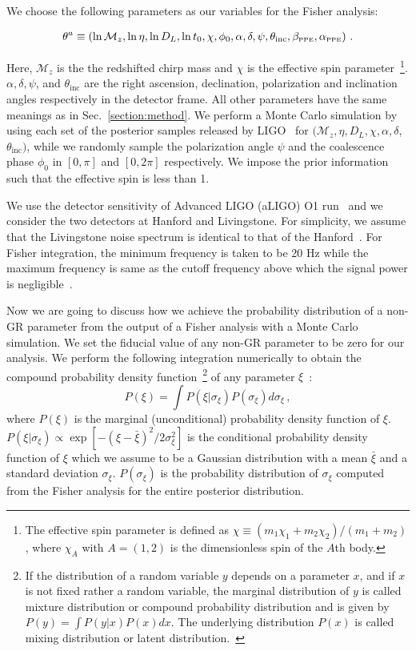 \documentclass[prd,twocolumn,nofootinbib]{revtex4-1}
\newcommand\be{\begin{equation}}
\newcommand\ba{\begin{eqnarray}}
\newcommand\ee{\end{equation}}
\newcommand\ea{\end{eqnarray}}
\newcommand\bw{\begin{widetext}}
\newcommand\ew{\end{widetext}}
\newcommand{\lb}{\left(}
\newcommand{\rb}{\right)}
\newcommand{\PPE}{{\mbox{\tiny PPE}}}
\begin{document}
We choose the following parameters as our variables for the Fisher analysis:
\bw
\ba\label{parameters}
\theta^a\equiv \lb \ln{\mathcal{M}_z}, \ln{\eta}, \ln{D_L}, \ln{t_0}, \chi, \phi_0, \alpha, \delta, \psi, \theta_{\text{inc}}, \beta_{\PPE}, \alpha_{\PPE} \rb\,.
\ea
\ew
Here, $\mathcal{M}_z$ is the the redshifted chirp mass and $\chi$ is the effective spin parameter~\footnote{The effective spin parameter is defined as $\chi\equiv\lb m_1 \chi_1+m_2\chi_2\rb /\lb m_1+m_2\rb$, where $\chi_A$ with $A=(1,2)$ is the dimensionless spin of the $A$th body.}. $\alpha, \delta, \psi$, and  $\theta_{\text{inc}}$ are the right ascension, declination, polarization and inclination angles respectively in the detector frame. All other parameters have the same meanings as in Sec.~\ref{section:method}. 
We perform a Monte Carlo simulation by using each set of the posterior samples released by LIGO~\cite{ligo:sample} for $(\mathcal{M}_z, \eta, D_L, \chi, \alpha, \delta$, $\theta_{\text{inc}})$, while we randomly sample the polarization angle $\psi$ and the coalescence phase $\phi_0$ in $[0,\pi]$ and $[0,2\pi]$ respectively.
We impose the prior information such that the effective spin is less than 1.

We use the detector sensitivity of Advanced LIGO (aLIGO) O1 run~\cite{LIGOScientific:2018mvr} and we consider the two detectors at Hanford and Livingstone. For simplicity, we assume that the Livingstone noise spectrum is identical to that of the Hanford~\cite{Yunes:2009yz}. For Fisher integration, the minimum frequency is taken to be 20 Hz while the maximum frequency is same as the cutoff frequency above which the signal power is negligible~\cite{Ajith:2009bn}.


Now we are going to discuss how we achieve the probability distribution of a non-GR parameter from the output of a Fisher analysis with a Monte Carlo simulation. We set the  fiducial value of any non-GR parameter to be zero for our analysis. We perform the following integration numerically to obtain the compound probability density function~\footnote{If the distribution of a random variable $y$ depends on a parameter $x$, and if $x$ is not fixed rather a random variable, the marginal distribution of $y$ is called mixture distribution or compound probability distribution and is given by $P\left(y\right)=\int P\left(y|x\right) P\left(x\right)dx$. The underlying distribution $P\left(x\right)$ is called mixing distribution or latent distribution.~\cite{2016arXiv160204060R}} of any parameter $\xi$~:
\be
\label{eq3:1}
P\lb\xi\rb=\int P\lb \xi|\sigma_{\xi}\rb P\lb \sigma_{\xi}\rb d\sigma_{\xi}\,,
\ee
where $P\lb\xi\rb$ is the marginal (unconditional) probability density function of $\xi$. $P\lb \xi|\sigma_{\xi}\rb \propto \exp[-(\xi-\bar \xi)^2/2\sigma_{\xi}^2]$ is the conditional probability density function of $\xi$ which we assume to be a Gaussian distribution with a mean $\bar \xi$ and a standard deviation $\sigma_\xi$. $P\lb\sigma_\xi\rb$ is the probability distribution of $\sigma_\xi$ computed from the Fisher analysis for the entire posterior distribution.
\end{document}

